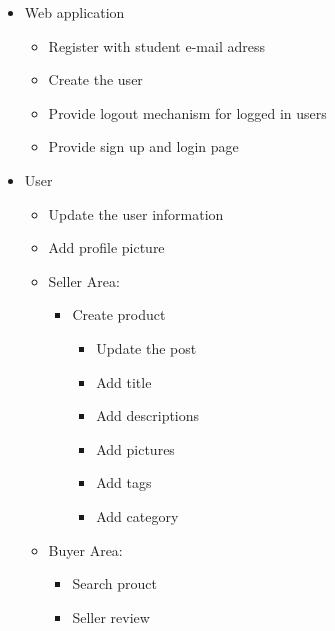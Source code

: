     \begin{itemize}
        \item Web application
        \begin{itemize}
            \item Register with student e-mail adress
            \item Create the user
            \item Provide logout mechanism for logged in users
            \item Provide sign up and login page
        \end{itemize}
        \item User
        \begin{itemize}
            \item Update the user information
            \item Add profile picture
            \item Seller Area:
            \begin{itemize}
                \item Create product
                \begin{itemize}
                    \item Update the post
                    \item Add title
                    \item Add descriptions
                    \item Add pictures
                    \item Add tags
                    \item Add category
                \end{itemize}
            \end{itemize}
            \item Buyer Area:
            \begin{itemize}
                \item Search prouct
                \item Seller review
            \end{itemize}
        \end{itemize}
    \end{itemize}